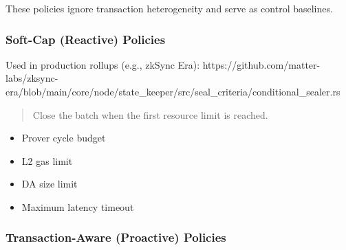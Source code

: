 These policies ignore transaction heterogeneity and serve as control baselines.

\subsubsection{Soft-Cap (Reactive) Policies}

Used in production rollups (e.g., zkSync Era):
https://github.com/matter-labs/zksync-era/blob/main/core/node/state_keeper/src/seal_criteria/conditional_sealer.rs

\begin{quote}
Close the batch when the first resource limit is reached.
\end{quote}

\begin{itemize}[leftmargin=1.5em]
    \item Prover cycle budget
    \item L2 gas limit
    \item DA size limit
    \item Maximum latency timeout
\end{itemize}

\subsubsection{Transaction-Aware (Proactive) Policies}


